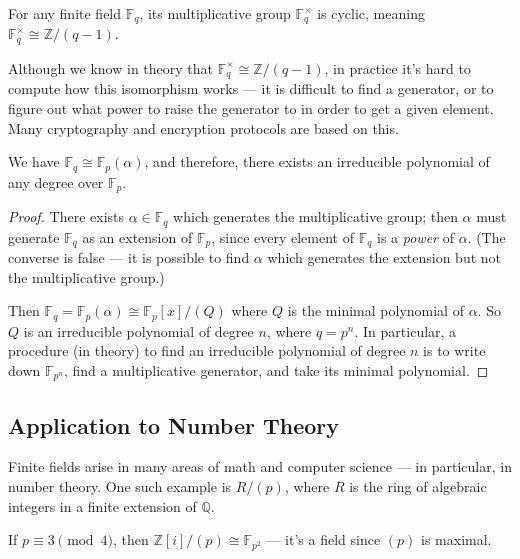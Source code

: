 \begin{corollary}
    For any finite field $\mathbb{F}_q$, its multiplicative group $\mathbb{F}_q^\times$ is cyclic, meaning $\mathbb{F}_q^\times \cong \mathbb{Z}/(q - 1)$. 
\end{corollary}

\begin{note}
    Although we know in theory that $\mathbb{F}_q^\times \cong \mathbb{Z}/(q - 1)$, in practice it's hard to compute how this isomorphism works --- it is difficult to find a generator, or to figure out what power to raise the generator to in order to get a given element. Many cryptography and encryption protocols are based on this. 
\end{note}

\begin{corollary}
    We have $\mathbb{F}_q \cong \mathbb{F}_p(\alpha)$, and therefore, there exists an irreducible polynomial of any degree over $\mathbb{F}_p$. 
\end{corollary}

\begin{proof}
    There exists $\alpha \in \mathbb{F}_q$ which generates the multiplicative group; then $\alpha$ must generate $\mathbb{F}_q$ as an extension of $\mathbb{F}_p$, since every element of $\mathbb{F}_q$ is a \emph{power} of $\alpha$. (The converse is false --- it is possible to find $\alpha$ which generates the extension but not the multiplicative group.) 

    Then $\mathbb{F}_q = \mathbb{F}_p(\alpha) \cong \mathbb{F}_p[x]/(Q)$ where $Q$ is the minimal polynomial of $\alpha$. So $Q$ is an irreducible polynomial of degree $n$, where $q = p^n$. In particular, a procedure (in theory) to find an irreducible polynomial of degree $n$ is to write down $\mathbb{F}_{p^n}$, find a multiplicative generator, and take its minimal polynomial.
\end{proof}

\subsection{Application to Number Theory}

Finite fields arise in many areas of math and computer science --- in particular, in number theory. One such example is $R/(p)$, where $R$ is the ring of algebraic integers in a finite extension of $\mathbb{Q}$. 

\begin{example}
    If $p \equiv 3 \pmod{4}$, then $\mathbb{Z}[i]/(p) \cong \mathbb{F}_{p^2}$ --- it's a field since $(p)$ is maximal. 
\end{example}

